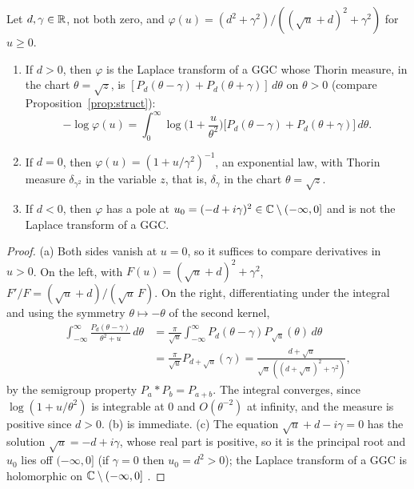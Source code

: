 \begin{lemma}\label{cp:lem:pair}
Let $d,\gamma\in\mathbb{R}$, not both zero, and $\varphi(u)=(d^2+\gamma^2)/((\sqrt u+d)^2+\gamma^2)$ for $u\ge0$.
\begin{enumerate}
\item[(a)] If $d>0$, then $\varphi$ is the Laplace transform of a GGC whose Thorin measure, in the chart $\theta=\sqrt z$, is $[P_d(\theta-\gamma)+P_d(\theta+\gamma)]\,d\theta$ on $\theta>0$ (compare Proposition~\ref{prop:struct}):
\[
-\log\varphi(u)=\int_0^\infty\log\Big(1+\frac u{\theta^2}\Big)\big[P_d(\theta-\gamma)+P_d(\theta+\gamma)\big]\,d\theta.
\]
\item[(b)] If $d=0$, then $\varphi(u)=(1+u/\gamma^2)^{-1}$, an exponential law, with Thorin measure $\delta_{\gamma^2}$ in the variable $z$, that is, $\delta_\gamma$ in the chart $\theta=\sqrt z$.
\item[(c)] If $d<0$, then $\varphi$ has a pole at $u_0=(-d+i\gamma)^2\in\mathbb{C}\setminus(-\infty,0]$ and is not the Laplace transform of a GGC.
\end{enumerate}
\end{lemma}

\begin{proof}
(a) Both sides vanish at $u=0$, so it suffices to compare derivatives in $u>0$. On the left, with $F(u)=(\sqrt u+d)^2+\gamma^2$, $F'/F=(\sqrt u+d)/(\sqrt u\,F)$. On the right, differentiating under the integral and using the symmetry $\theta\mapsto-\theta$ of the second kernel,
\[\begin{aligned}
\int_{-\infty}^{\infty}\frac{P_d(\theta-\gamma)}{\theta^2+u}\,d\theta&=\frac{\pi}{\sqrt u}\int_{-\infty}^\infty P_d(\theta-\gamma)P_{\sqrt u}(\theta)\,d\theta\\&=\frac{\pi}{\sqrt u}P_{d+\sqrt u}(\gamma)=\frac{d+\sqrt u}{\sqrt u\,((d+\sqrt u)^2+\gamma^2)},
\end{aligned}\]
by the semigroup property $P_a*P_b=P_{a+b}$. The integral converges, since $\log(1+u/\theta^2)$ is integrable at $0$ and $O(\theta^{-2})$ at infinity, and the measure is positive since $d>0$. (b) is immediate. (c) The equation $\sqrt u+d-i\gamma=0$ has the solution $\sqrt u=-d+i\gamma$, whose real part is positive, so it is the principal root and $u_0$ lies off $(-\infty,0]$ (if $\gamma=0$ then $u_0=d^2>0$); the Laplace transform of a GGC is holomorphic on $\mathbb{C}\setminus(-\infty,0]$ \cite{Bondesson}.
\end{proof}

